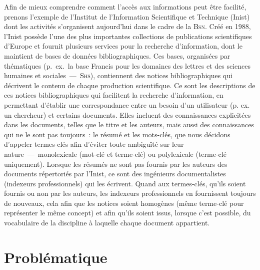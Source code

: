       Afin de mieux comprendre comment l'accès aux informations peut être
      facilité, prenons l'exemple de l'Institut de l'Information Scientifique et
      Technique (Inist) dont les activités s'organisent aujourd'hui dans le
      cadre de la \textsc{Bsn}. Créé en 1988, l'Inist possède l'une des plus
      importantes collections de publications scientifiques d'Europe et fournit
      plusieurs services pour la recherche d'information, dont le maintient de
      bases de données bibliographiques. Ces bases, organisées par thématiques
      (p.~ex.~la base Francis pour les domaines des lettres et des sciences
      humaines et sociales~---~\textsc{Shs}), contiennent des notices
      bibliographiques qui décrivent le contenu de chaque production
      scientifique. Ce sont les descriptions de ces notices bibliographiques qui
      facilitent la recherche d'information, en permettant d'établir une
      correspondance entre un besoin d'un utilisateur (p. ex. un chercheur) et
      certains documents. Elles incluent des connaissances explicitées dans les
      documents, telles que le titre et les auteurs, mais aussi des
      connaissances qui ne le sont pas toujours~: le résumé et les mots-clés,
      que nous décidons d'appeler termes-clés afin d'éviter toute ambiguïté sur
      leur nature~---~monolexicale (mot-clé et terme-clé) ou polylexicale
      (terme-clé uniquement). Lorsque les résumés ne sont pas fournis par les
      auteurs des documents répertoriés par l'Inist, ce sont des ingénieurs
      documentalistes (indexeurs professionnels) qui les écrivent. Quand aux
      termes-clés, qu'ils soient fournis ou non par les auteurs, les indexeurs
      professionnels en fournissent toujours de nouveaux, cela afin que les
      notices soient homogènes (même terme-clé pour représenter le même
      concept) et afin qu'ils soient issus, lorsque c'est possible, du
      vocabulaire de la discipline à laquelle chaque document appartient.




    \section{Problématique}


